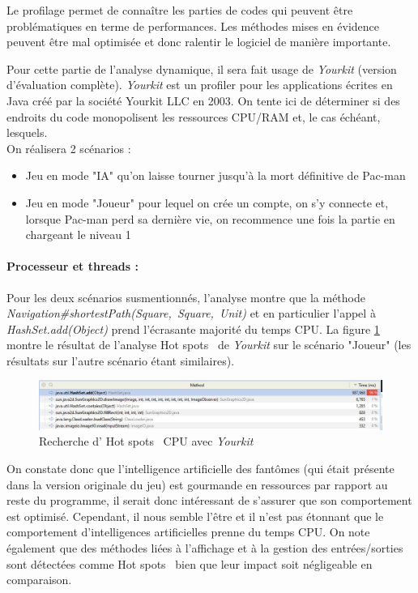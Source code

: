 \documentclass[12pt, openany]{report}
\begin{document}
Le profilage permet de connaître les parties de codes qui peuvent être problématiques en terme de performances. Les méthodes mises en évidence peuvent être mal optimisée et donc ralentir le logiciel de manière importante.


Pour cette partie de l'analyse dynamique, il sera fait usage de \textit{Yourkit} (version d'évaluation complète). \textit{Yourkit} est un profiler pour les applications écrites en Java créé par la société Yourkit LLC en 2003.  On tente ici de déterminer si des endroits du code monopolisent les ressources CPU/RAM et, le cas échéant, lesquels.\\


On réalisera 2 scénarios :
\begin{itemize}
	\item Jeu en mode "IA" qu'on laisse tourner jusqu'à la mort définitive de Pac-man
	\item Jeu en mode "Joueur" pour lequel on crée un compte, on s'y connecte et, lorsque Pac-man perd sa dernière vie, on recommence une fois la partie en chargeant le niveau 1
\end{itemize}
\paragraph{Processeur et threads : }
Pour les deux scénarios susmentionnés, l'analyse montre que la méthode \mbox{\textit{Navigation\#shortestPath(Square, Square, Unit)}} et en particulier l'appel à \mbox{\textit{HashSet.add(Object)}} prend l'écrasante majorité du temps CPU. La figure \ref{hotspot} montre le résultat de l'analyse \og Hot spots \fg \, de \textit{Yourkit} sur le scénario "Joueur" (les résultats sur l'autre scénario étant similaires).
\begin{figure}[h]
	\centering
	\includegraphics[width=16cm]{Images/hotspot.JPG}
	\caption{\label{hotspot} Recherche d' \og Hot spots \fg \, CPU avec \textit{Yourkit}}
\end{figure}

On constate donc que l'intelligence artificielle des fantômes (qui était présente dans la version originale du jeu) est gourmande en ressources par rapport au reste du programme, il serait donc intéressant de s'assurer que son comportement est optimisé. Cependant, il nous semble l'être et il n'est pas étonnant que le comportement d'intelligences artificielles prenne du temps CPU. On note également que des méthodes liées à l'affichage et à la gestion des entrées/sorties sont détectées comme \og Hot spots \fg \, bien que leur impact soit négligeable en comparaison.
\end{document}
